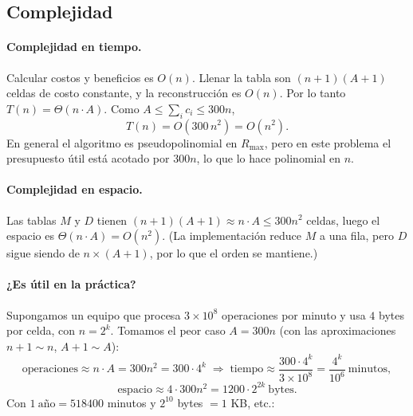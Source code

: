 \documentclass[11pt,letterpaper]{article}
\newcommand{\Rmax}{R_{\max}}
\begin{document}
\subsection{Complejidad}

\paragraph{Complejidad en tiempo.} Calcular costos y beneficios es $O(n)$.
Llenar la tabla son $(n+1)(A+1)$ celdas de costo constante, y la
reconstrucción es $O(n)$. Por lo tanto $T(n) = \Theta(n \cdot A)$. Como
$A \le \sum_i c_i \le 300n$,
\[
  T(n) = O(300\, n^2) = O(n^2).
\]
En general el algoritmo es pseudopolinomial en $\Rmax$, pero en este problema
el presupuesto útil está acotado por $300n$, lo que lo hace polinomial en $n$.

\paragraph{Complejidad en espacio.} Las tablas $M$ y $D$ tienen
$(n+1)(A+1) \approx n\cdot A \le 300n^2$ celdas, luego el espacio es
$\Theta(n\cdot A) = O(n^2)$. (La implementación reduce $M$ a una fila, pero
$D$ sigue siendo de $n \times (A+1)$, por lo que el orden se mantiene.)

\paragraph{¿Es útil en la práctica?} Supongamos un equipo que procesa
$3\times 10^8$ operaciones por minuto y usa $4$ bytes por celda, con
$n = 2^k$. Tomamos el peor caso $A = 300n$ (con las aproximaciones
$n+1\sim n$, $A+1 \sim A$):
\[
  \text{operaciones} \approx n\cdot A = 300 n^2 = 300\cdot 4^k
  \;\Rightarrow\;
  \text{tiempo} \approx \frac{300\cdot 4^k}{3\times 10^8} = \frac{4^k}{10^6}\ \text{minutos},
\]
\[
  \text{espacio} \approx 4 \cdot 300 n^2 = 1200 \cdot 2^{2k}\ \text{bytes}.
\]
Con $1\ \text{año} = 518400$ minutos y $2^{10}$ bytes $= 1$ KB, etc.:
\end{document}
